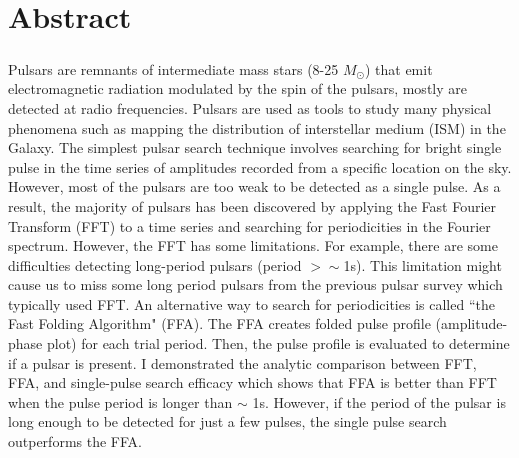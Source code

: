 \documentclass[../chapter1/thesis_msc.tex]{subfiles}
\begin{document}
    \chapter*{Abstract}
    \thispagestyle{plain}
\paragraph{} Pulsars are remnants of intermediate mass stars (8-25 $M_\odot$) that emit electromagnetic radiation modulated by the spin of the pulsars, mostly  are detected at radio frequencies. Pulsars are used as tools to study many physical phenomena such as mapping the distribution of interstellar medium (ISM) in the Galaxy. The simplest pulsar search technique involves searching for bright single pulse in the time series of amplitudes recorded from a specific location on the sky. However, most of the pulsars are too weak to be detected as a single pulse. As a result, the majority of pulsars has been discovered by applying the Fast Fourier Transform (FFT) to a time series and searching for periodicities in the Fourier spectrum.
However, the FFT has some limitations. For example, there are some difficulties detecting long-period pulsars (period  $> \sim$1s). This limitation might cause us to miss some long period pulsars from the previous pulsar survey which typically used FFT.
An alternative way to search for periodicities is called ``the Fast Folding Algorithm" (FFA). The FFA creates folded pulse profile (amplitude-phase plot) for each trial period. Then, the pulse profile is evaluated to determine if a pulsar is present. 
 I demonstrated the analytic comparison between FFT, FFA, and single-pulse search efficacy which shows that FFA is better than FFT when the pulse period is longer than  $\sim$ 1s. However, if the period of the pulsar is long enough to be detected for just a few pulses, the single pulse search outperforms the FFA.  

\end{document}
